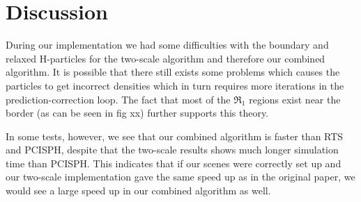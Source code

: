 \documentclass[../../main.tex]{subfiles}
\begin{document}


\section{Discussion}

During our implementation we had some difficulties with the boundary and relaxed H-particles for the two-scale algorithm and therefore our combined algorithm. It is possible that there still exists some problems which causes the particles to get incorrect densities which in turn requires more iterations in the prediction-correction loop. The fact that most of the $\Re_1$ regions exist near the border (as can be seen in fig xx) further supports this theory. 

In some tests, however, we see that our combined algorithm is faster than RTS and PCISPH, despite that the two-scale results shows much longer simulation time than PCISPH. This indicates that if our scenes were correctly set up and our two-scale implementation gave the same speed up as in the original paper, we would see a large speed up in our combined algorithm as well. 


\end{document}
